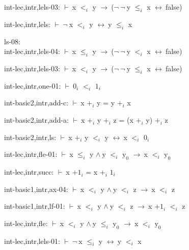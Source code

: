 \documentclass[a4paper]{article}
\newcommand{\Fol}{\mbox{$\vdash\ $}}
\newcommand{\Not}{\mbox{$\neg\ $}}
\newcommand{\And}{\mbox{$\wedge\ $}}
\newcommand{\Imp}{\mbox{$\rightarrow\ $}}
\newcommand{\Equiv}{\mbox{$\leftrightarrow\ $}}
\begin{document}
int-lec,intr,lels-03: 
 \Fol x $\mbox{$<$}_{i}$ y \Imp (\Not \Not y $\mbox{$\le$}_{i}$ x \Equiv false)



int-lec,intr,lels: 
 \Fol \Not x $\mbox{$<$}_{i}$ y \Equiv y $\mbox{$\le$}_{i}$ x



\bigskip

ls-08:\\ int-lec,intr,lels-04: 
 \Fol x $\mbox{$\le$}_{i}$ y \Imp (\Not \Not y $\mbox{$<$}_{i}$ x \Equiv false)



int-lec,intr,lels-03: 
 \Fol x $\mbox{$<$}_{i}$ y \Imp (\Not \Not y $\mbox{$\le$}_{i}$ x \Equiv false)



int-lec,intr,one-01: 
 \Fol $\mbox{0}_{i}$ $\mbox{$<$}_{i}$ $\mbox{1}_{i}$



int-basic2,intr,add-c: 
 \Fol x $\mbox{+}_{i}$ y = y $\mbox{+}_{i}$ x



int-basic2,intr,add-a: 
 \Fol x $\mbox{+}_{i}$ y $\mbox{+}_{i}$ z = (x $\mbox{+}_{i}$ y) $\mbox{+}_{i}$ z



int-basic2,intr,ls: 
 \Fol x $\mbox{+}_{i}$ y $\mbox{$<$}_{i}$ y \Equiv x $\mbox{$<$}_{i}$ $\mbox{0}_{i}$



int-lec,intr,fle-01: 
 \Fol x $\mbox{$\le$}_{i}$ y \And y $\mbox{$<$}_{i}$ $\mbox{y}_{0}$ \Imp x $\mbox{$<$}_{i}$ $\mbox{y}_{0}$



int-lec,intr,succ: 
 \Fol x $\mbox{+1}_{i}$ = x $\mbox{+}_{i}$ $\mbox{1}_{i}$



int-basic1,intr,ax-04: 
 \Fol x $\mbox{$<$}_{i}$ y \And y $\mbox{$<$}_{i}$ z \Imp x $\mbox{$<$}_{i}$ z



int-basic1,intr,lf-01: 
 \Fol x $\mbox{$<$}_{i}$ y \And y $\mbox{$<$}_{i}$ z \Imp x $\mbox{+1}_{i}$ $\mbox{$<$}_{i}$ z



int-lec,intr,fle: 
 \Fol x $\mbox{$<$}_{i}$ y \And y $\mbox{$\le$}_{i}$ $\mbox{y}_{0}$ \Imp x $\mbox{$<$}_{i}$ $\mbox{y}_{0}$



int-lec,intr,lels-01: 
 \Fol \Not x $\mbox{$\le$}_{i}$ y \Equiv y $\mbox{$<$}_{i}$ x
\end{document}
